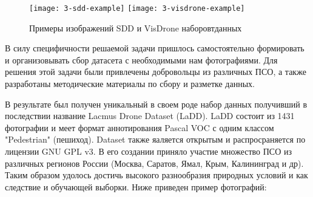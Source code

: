 \begin{figure}[H]
    \centering
    \texttt{[image: 3-sdd-example]}
    \hfill
    \texttt{[image: 3-visdrone-example]}
    \caption{Примеры изображений SDD и VisDrone наборовтданных} \label{sdd-visdrone-example}
\end{figure}


В силу специфичности решаемой задачи пришлось самостоятельно формировать и организовывать сбор датасета с необходимыми нам фотографиями. Для решения этой задачи были привлечены добровольцы из различных ПСО, а также разработаны методические материалы по сбору и разметке данных.

В результате был получен уникальный в своем роде набор данных получивший в последствии название Lacmus Drone Dataset (LaDD). LaDD состоит из 1431 фотографии и меет формат аннотирования Pascal VOC с одним классом "Pedestrian" (пешиход). Dataset также яаляется открытым и распросраняется по лицензии GNU GPL v3. В его создании приняло участие множество ПСО из различных регионов России (Москва, Саратов, Ямал, Крым, Калининград и др). Таким образом удолось достичь высокого разнообразия природных условий и как следствие и обучающей выборки. Ниже приведен пример фотографий:

